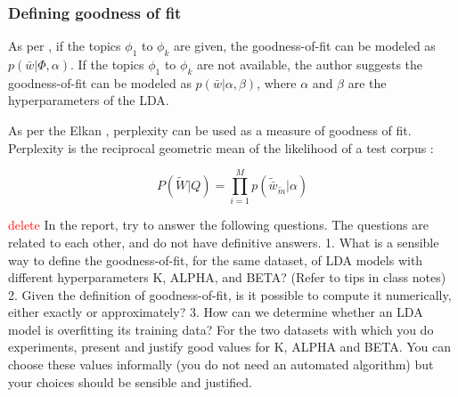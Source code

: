 \documentclass[11pt,a4paper,oneside]{article}
\def\red{\textcolor{red}}
\begin{document}
\subsubsection{Defining goodness of fit}
As per \cite{nguyen}, if the topics $\phi_{1}$ to $\phi_{k}$ are given, the goodness-of-fit can be modeled as $p(\bar{w}| \Phi,\alpha )$. If the topics $\phi_{1}$ to $\phi_{k}$ are not available, the author suggests the goodness-of-fit can be modeled as $p(\bar{w}| \alpha,\beta )$, where $\alpha$ and $\beta$ are the hyperparameters of the LDA.

As per the Elkan \cite{perplexity}, perplexity can be used as a measure of goodness of fit. Perplexity is the reciprocal geometric mean of the likelihood of a test corpus :

\begin{equation}
P( \tilde{W} | Q) = \prod_{i=1}^M{p(\tilde{\bar{w}}_{\tilde{m}} | \alpha)}
\end{equation}

\red{delete}
In the report, try to answer the following questions. The questions are related to each other, and do not have definitive answers.
1. What is a sensible way to define the goodness-of-fit, for the same dataset, of LDA models with different hyperparameters K, ALPHA, and BETA? (Refer to tips in class notes)
2. Given the definition of goodness-of-fit, is it possible to compute it numerically, either exactly or approximately?
3. How can we determine whether an LDA model is overfitting its training data?
For the two datasets with which you do experiments, present and justify good values for K, ALPHA and BETA. You can choose these values informally (you do not need an automated algorithm) but your choices should be sensible and justified.




\end{document}
